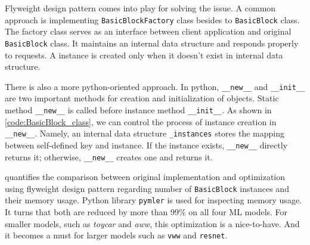 Flyweight design pattern comes into play for solving the issue. A common approach is implementing \texttt{BasicBlockFactory} class besides to \texttt{BasicBlock} class. The factory class serves as an interface between client application and original \texttt{BasicBlock} class. It maintains an internal data structure and responds properly to requests. A instance is created only when it doesn't exist in internal data structure.

There is also a more python-oriented approach. In python, \texttt{\_\_new\_\_} and \texttt{\_\_init\_\_} are two important methods for creation and initialization of objects. Static method \texttt{\_\_new\_\_} is called before instance method \texttt{\_\_init\_\_}. As shown in \cref{code:BasicBlock_class}, we can control the process of instance creation in \texttt{\_\_new\_\_}. Namely, an internal data structure \texttt{\_instances} stores the mapping between self-defined key and instance. If the instance exists, \texttt{\_\_new\_\_} directly returns it; otherwise, \texttt{\_\_new\_\_} creates one and returns it.

 quantifies the comparison between original implementation and optimization using flyweight design pattern regarding number of \texttt{BasicBlock} instances and their memory usage. Python library \texttt{pymler} is used for inspecting memory usage. It turns that both are reduced by more than 99\% on all four ML models. For smaller models, such as \textit{toycar} and \textit{aww}, this optimization is a nice-to-have. And it becomes a must for larger models such as \texttt{vww} and \texttt{resnet}.

\medskip
\begin{table}[h!]
    \centering
    \caption{Comparison of total memory usage of \texttt{BasicBlock} instances}
    \label{tab:comparison_mem_usage}
\end{table}

